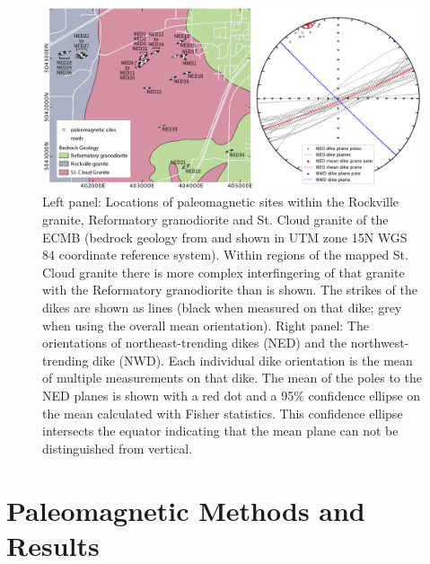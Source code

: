 \documentclass[draft]{agujournal2019}
\begin{document}
\begin{figure}[!ht]
\centering
\noindent\includegraphics[width=\textwidth]{./figures/map_sites.pdf}
\caption{\small{Left panel: Locations of paleomagnetic sites within the Rockville granite, Reformatory granodiorite and St. Cloud granite of the ECMB (bedrock geology from  and shown in UTM zone 15N WGS 84 coordinate reference system). Within regions of the mapped St. Cloud granite there is more complex interfingering of that granite with the Reformatory granodiorite than is shown. The strikes of the dikes are shown as lines (black when measured on that dike; grey when using the overall mean orientation). Right panel: The orientations of northeast-trending dikes (NED) and the northwest-trending dike (NWD). Each individual dike orientation is the mean of multiple measurements on that dike. The mean of the poles to the NED planes is shown with a red dot and a 95$\%$ confidence ellipse on the mean calculated with Fisher statistics. This confidence ellipse intersects the equator indicating that the mean plane can not be distinguished from vertical.}}
\label{fig:site_map}
\end{figure}

\section*{Paleomagnetic Methods and Results}
\end{document}
